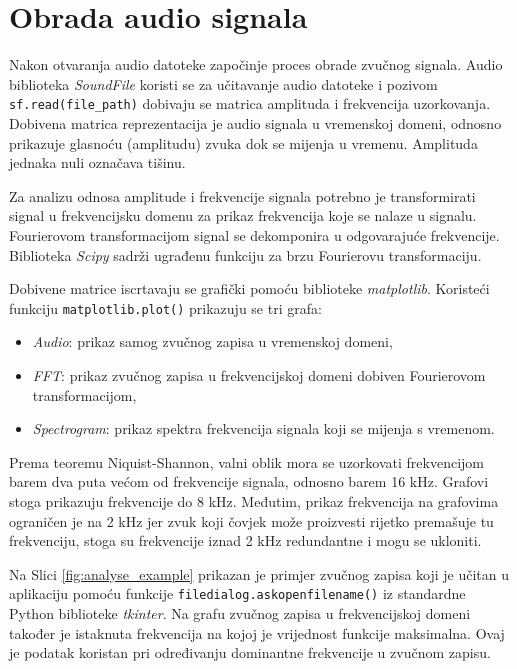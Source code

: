 \chapter{Obrada audio signala}

Nakon otvaranja audio datoteke započinje proces obrade zvučnog signala. Audio biblioteka \textit{SoundFile} koristi se za učitavanje audio datoteke i pozivom \lstinline|sf.read(file_path)| dobivaju se matrica amplituda i frekvencija uzorkovanja. Dobivena matrica reprezentacija je audio signala u vremenskoj domeni, odnosno prikazuje glasnoću (amplitudu) zvuka dok se mijenja u vremenu. Amplituda jednaka nuli označava tišinu.

Za analizu odnosa amplitude i frekvencije signala potrebno je transformirati signal u frekvencijsku domenu za prikaz frekvencija koje se nalaze u signalu. Fourierovom transformacijom signal se dekomponira u odgovarajuće frekvencije. Biblioteka \textit{Scipy} sadrži ugrađenu funkciju za brzu Fourierovu transformaciju. 

Dobivene matrice iscrtavaju se grafički pomoću biblioteke \textit{matplotlib}. Koristeći funkciju \lstinline|matplotlib.plot()| prikazuju se tri grafa:
\begin{itemize}
	\item \textit{Audio}: prikaz samog zvučnog zapisa u vremenskoj domeni,
	\item \textit{FFT}: prikaz zvučnog zapisa u frekvencijskoj domeni dobiven Fourierovom transformacijom,
	\item \textit{Spectrogram}: prikaz spektra frekvencija signala koji se mijenja s vremenom.
\end{itemize}

Prema teoremu Niquist-Shannon, valni oblik mora se uzorkovati frekvencijom barem dva puta većom od frekvencije signala, odnosno barem 16 kHz. Grafovi stoga prikazuju frekvencije do 8 kHz. Međutim, prikaz frekvencija na grafovima ograničen je na 2 kHz jer zvuk koji čovjek može proizvesti rijetko premašuje tu frekvenciju, stoga su frekvencije iznad 2 kHz redundantne i mogu se ukloniti. 

Na Slici \ref{fig:analyse_example} prikazan je primjer zvučnog zapisa koji je učitan u aplikaciju pomoću funkcije \lstinline|filedialog.askopenfilename()| iz standardne Python biblioteke \textit{tkinter}. Na grafu zvučnog zapisa u frekvencijskoj domeni također je istaknuta frekvencija na kojoj je vrijednost funkcije maksimalna. Ovaj je podatak koristan pri određivanju dominantne frekvencije u zvučnom zapisu. 


